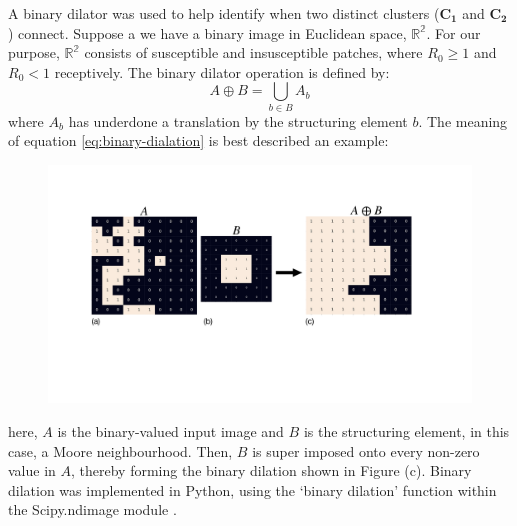 A binary dilator was used to help identify when two distinct clusters ($\mathbf{C_1}$ and $\mathbf{C_2}$) connect.
Suppose a we have a binary image in Euclidean space, $\mathbb{R^2}$.
For our purpose, $\mathbb{R^2}$ consists of susceptible and insusceptible patches, where $R_0 \ge 1$ and $R_0 < 1$ receptively. 
The binary dilator operation is defined by:
\begin{equation}
    \label{eq:binary-dialation}
    A \oplus B = \bigcup_{b \in B} A_b
\end{equation}
where $A_b$ has underdone a translation by the structuring element $b$.
The meaning of equation \ref{eq:binary-dialation} is best described an example:
\begin{figure}[h!]
    \centering
    \includegraphics[scale=0.3]{appendix/figures/binary-dialation.pdf}
    \label{fig:my_label}
\end{figure}

here, $A$ is the binary-valued input image and $B$ is the structuring element, in this case, a Moore neighbourhood. 
Then, $B$ is super imposed onto every non-zero value in $A$, thereby forming the binary dilation shown in Figure (c).
Binary dilation was implemented in Python, using the `binary dilation' function within the Scipy.ndimage module \cite{scipy}.

